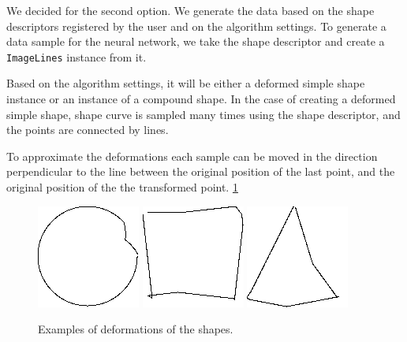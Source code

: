We decided for the second option. We generate the data based on the shape descriptors registered by the user and on the algorithm settings. To generate a data sample for the neural network, we take the shape descriptor and create a \texttt{ImageLines} instance from it.

Based on the algorithm settings, it will be either a deformed simple shape instance or an instance of a compound shape. In the case of creating a deformed simple shape, shape curve is sampled many times using the shape descriptor, and the points are connected by lines.
 
To approximate the deformations each sample can be moved in the direction perpendicular to the line between the original position of the last point, and the original position of the the transformed point. \ref{deformed}

\begin{figure}
\centering
\includegraphics[width=.3\linewidth]{ext/images/deformed0.png}
\quad
\includegraphics[width=.3\linewidth]{ext/images/deformed1.png}
\quad
\includegraphics[width=.3\linewidth]{ext/images/deformed2.png}

\caption{Examples of deformations of the shapes.}
\label{deformed}
\end{figure}

